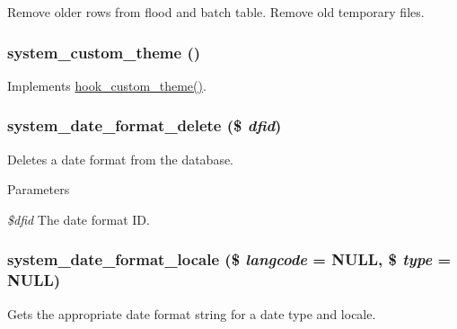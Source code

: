 Remove older rows from flood and batch table. Remove old temporary files. \hypertarget{system_8module_aa646e2eedcee8087ba2cd91914e7fbdc}{
\subsubsection[{system\_\-custom\_\-theme}]{\setlength{\rightskip}{0pt plus 5cm}system\_\-custom\_\-theme ()}}
\label{system_8module_aa646e2eedcee8087ba2cd91914e7fbdc}
Implements \hyperlink{group__hooks_gab83dce4ef80bc5005ee0de98fc005b1f}{hook\_\-custom\_\-theme()}. \hypertarget{system_8module_ad5772362b4f49cec71d9572c6f02ebfd}{
\subsubsection[{system\_\-date\_\-format\_\-delete}]{\setlength{\rightskip}{0pt plus 5cm}system\_\-date\_\-format\_\-delete (\$ {\em dfid})}}
\label{system_8module_ad5772362b4f49cec71d9572c6f02ebfd}
Deletes a date format from the database.


\begin{DoxyParams}{Parameters}
\item[{\em \$dfid}]The date format ID. \end{DoxyParams}
\hypertarget{system_8module_a27ec4ab4ca19ea7d22db475691d1eea5}{
\subsubsection[{system\_\-date\_\-format\_\-locale}]{\setlength{\rightskip}{0pt plus 5cm}system\_\-date\_\-format\_\-locale (\$ {\em langcode} = {\ttfamily NULL}, \/  \$ {\em type} = {\ttfamily NULL})}}
\label{system_8module_a27ec4ab4ca19ea7d22db475691d1eea5}
Gets the appropriate date format string for a date type and locale.


